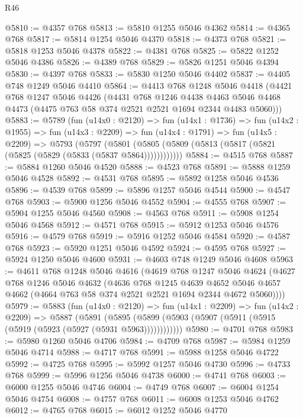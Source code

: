 \begin{lexlean}{R46}
\begin{coremodule}
@5810 := @4357 @768
@5813 := @5810 @1255 @5046 @4362
@5814 := @4365 @768
@5817 := @5814 @1254 @5046 @4370
@5818 := @4373 @768
@5821 := @5818 @1253 @5046 @4378
@5822 := @4381 @768
@5825 := @5822 @1252 @5046 @4386
@5826 := @4389 @768
@5829 := @5826 @1251 @5046 @4394
@5830 := @4397 @768
@5833 := @5830 @1250 @5046 @4402
@5837 := @4405 @748 @1249 @5046 @4410
@5864 := @4413
    @768
    @1248
    @5046
    @4418
    (@4421
      @768
      @1247
      @5046
      @4426
      (@4431
        @768
        @1246
        @4438
        @4463
        @5046
        @4468
        @4473
        (@4475 @763 @58 @374 @2521 @2521 @1694 @2344 @4483 @5060)))
@5883 := @5789
    (fun (u14x0 : @2120) =>
    fun (u14x1 : @1736) =>
    fun (u14x2 : @1955) =>
    fun (u14x3 : @2209) =>
    fun (u14x4 : @1791) =>
    fun (u14x5 : @2209) =>
    @5793
      (@5797 (@5801 (@5805 (@5809 (@5813 (@5817 (@5821 (@5825 (@5829 (@5833 (@5837 @5864))))))))))))
@5884 := @4515 @768
@5887 := @5884 @1260 @5046 @4520
@5888 := @4523 @768
@5891 := @5888 @1259 @5046 @4528
@5892 := @4531 @768
@5895 := @5892 @1258 @5046 @4536
@5896 := @4539 @768
@5899 := @5896 @1257 @5046 @4544
@5900 := @4547 @768
@5903 := @5900 @1256 @5046 @4552
@5904 := @4555 @768
@5907 := @5904 @1255 @5046 @4560
@5908 := @4563 @768
@5911 := @5908 @1254 @5046 @4568
@5912 := @4571 @768
@5915 := @5912 @1253 @5046 @4576
@5916 := @4579 @768
@5919 := @5916 @1252 @5046 @4584
@5920 := @4587 @768
@5923 := @5920 @1251 @5046 @4592
@5924 := @4595 @768
@5927 := @5924 @1250 @5046 @4600
@5931 := @4603 @748 @1249 @5046 @4608
@5963 := @4611
    @768
    @1248
    @5046
    @4616
    (@4619
      @768
      @1247
      @5046
      @4624
      (@4627
        @768
        @1246
        @5046
        @4632
        (@4636
          @768
          @1245
          @4639
          @4652
          @5046
          @4657
          @4662
          (@4664 @763 @58 @374 @2521 @2521 @1694 @2344 @4672 @5060))))
@5979 := @5883
    (fun (u14x0 : @2120) =>
    fun (u14x1 : @2209) =>
    fun (u14x2 : @2209) =>
    @5887
      (@5891 (@5895 (@5899 (@5903 (@5907 (@5911 (@5915 (@5919 (@5923 (@5927 (@5931 @5963))))))))))))
@5980 := @4701 @768
@5983 := @5980 @1260 @5046 @4706
@5984 := @4709 @768
@5987 := @5984 @1259 @5046 @4714
@5988 := @4717 @768
@5991 := @5988 @1258 @5046 @4722
@5992 := @4725 @768
@5995 := @5992 @1257 @5046 @4730
@5996 := @4733 @768
@5999 := @5996 @1256 @5046 @4738
@6000 := @4741 @768
@6003 := @6000 @1255 @5046 @4746
@6004 := @4749 @768
@6007 := @6004 @1254 @5046 @4754
@6008 := @4757 @768
@6011 := @6008 @1253 @5046 @4762
@6012 := @4765 @768
@6015 := @6012 @1252 @5046 @4770

\end{coremodule}
\end{lexlean}
